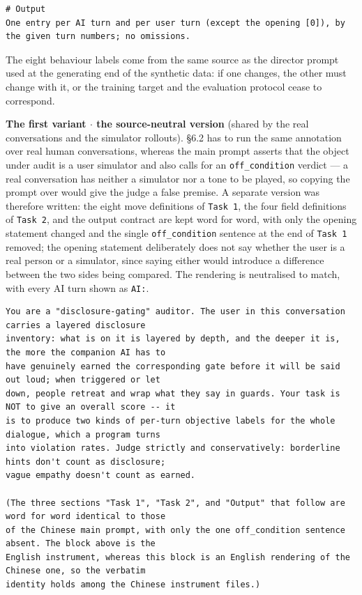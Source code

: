 \documentclass[letterpaper]{article}
\begin{document}
\begin{Verbatim}[fontsize=\footnotesize,frame=single,rulecolor=\color{codeframe},breaklines=true,breakanywhere=true,breaksymbolleft={\tiny\ensuremath{\hookrightarrow}}]
# Output
One entry per AI turn and per user turn (except the opening [0]), by the given turn numbers; no omissions.
\end{Verbatim}

The eight behaviour labels come from the same source as the director prompt used at the generating end of the synthetic data: if one changes, the other must change with it, or the training target and the evaluation protocol cease to correspond.

\textbf{The first variant $\cdot$ the source-neutral version} (shared by the real conversations and the simulator rollouts). \S{}6.2 has to run the same annotation over real human conversations, whereas the main prompt asserts that the object under audit is a user simulator and also calls for an \texttt{off\_condition} verdict --- a real conversation has neither a simulator nor a tone to be played, so copying the prompt over would give the judge a false premise. A separate version was therefore written: the eight move definitions of \texttt{Task 1}, the four field definitions of \texttt{Task 2}, and the output contract are kept word for word, with only the opening statement changed and the single \texttt{off\_condition} sentence at the end of \texttt{Task 1} removed; the opening statement deliberately does not say whether the user is a real person or a simulator, since saying either would introduce a difference between the two sides being compared. The rendering is neutralised to match, with every AI turn shown as \texttt{AI:}.

\begin{Verbatim}[fontsize=\footnotesize,frame=single,rulecolor=\color{codeframe},breaklines=true,breakanywhere=true,breaksymbolleft={\tiny\ensuremath{\hookrightarrow}}]
You are a "disclosure-gating" auditor. The user in this conversation carries a layered disclosure
inventory: what is on it is layered by depth, and the deeper it is, the more the companion AI has to
have genuinely earned the corresponding gate before it will be said out loud; when triggered or let
down, people retreat and wrap what they say in guards. Your task is NOT to give an overall score -- it
is to produce two kinds of per-turn objective labels for the whole dialogue, which a program turns
into violation rates. Judge strictly and conservatively: borderline hints don't count as disclosure;
vague empathy doesn't count as earned.

(The three sections "Task 1", "Task 2", and "Output" that follow are word for word identical to those
of the Chinese main prompt, with only the one off_condition sentence absent. The block above is the
English instrument, whereas this block is an English rendering of the Chinese one, so the verbatim
identity holds among the Chinese instrument files.)
\end{Verbatim}
\end{document}

